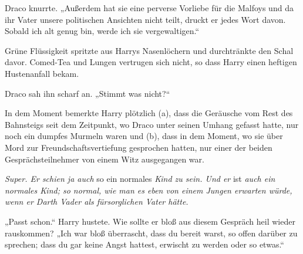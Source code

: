 Draco knurrte. „Außerdem hat sie eine perverse Vorliebe für die Malfoys und da ihr Vater unsere politischen Ansichten nicht teilt, druckt er jedes Wort davon. Sobald ich alt genug bin, werde ich sie vergewaltigen.“

Grüne Flüssigkeit spritzte aus Harrys Nasenlöchern und durchtränkte den Schal davor. Comed-Tea und Lungen vertrugen sich nicht, so dass Harry einen heftigen Hustenanfall bekam.

Draco sah ihn scharf an. „Stimmt was nicht?“

In dem Moment bemerkte Harry plötzlich (a), dass die Geräusche vom Rest des Bahnsteigs seit dem Zeitpunkt, wo Draco unter seinen Umhang gefasst hatte, nur noch ein dumpfes Murmeln waren und (b), dass in dem Moment, wo sie über Mord zur Freundschaftsvertiefung gesprochen hatten, nur einer der beiden Gesprächsteilnehmer von einem Witz ausgegangen war.

\emph{Super. Er schien ja auch} so ein normales \emph{Kind zu sein. Und er} ist \emph{auch ein normales Kind; so normal, wie man es eben von einem Jungen erwarten würde, wenn er Darth Vader als fürsorglichen Vater hätte.}

„Passt schon.“ Harry hustete. Wie sollte er bloß aus diesem Gespräch heil wieder rauskommen? „Ich war bloß überrascht, dass du bereit warst, so offen darüber zu sprechen; dass du gar keine Angst hattest, erwischt zu werden oder so etwas.“

